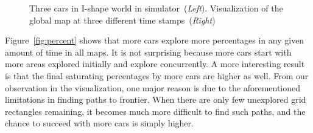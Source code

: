 \begin{figure}
\caption{Three cars in I-shape world in simulator~(\emph{Left}). Visualization of the global map at three different time stamps~(\emph{Right})}\label{fig:I-map-progress}
\end{figure}

Figure~\ref{fig:percent} shows that more cars explore more percentages in any given amount of time in all maps.
It is not surprising because more cars start with more areas explored initially and explore concurrently.
A more interesting result is that the final saturating percentages by more cars are higher as well.
From our observation in the visualization, one major reason is due to the aforementioned limitations in finding paths to frontier.
When there are only few unexplored grid rectangles remaining,
it becomes much more difficult to find such paths,
and the chance to succeed with more cars is simply higher.


